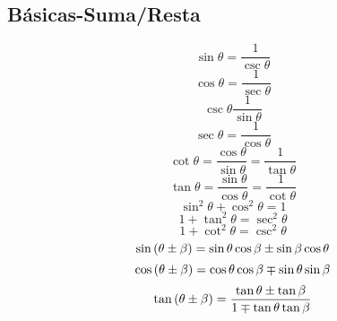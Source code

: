 \documentclass[
	12pt, %
	fleqn, %
	a4paper, %
	oneside, %
]{LegrandOrangeBook}
\begin{document}
\subsection{Básicas-Suma/Resta}
\begin{equation}
\sin\theta=\frac{1}{\csc\theta}
\end{equation}
\begin{equation}
\cos\theta=\frac{1}{\sec\theta}
\end{equation}
\begin{equation}
\csc\theta\frac{1}{\sin\theta}
\end{equation}
\begin{equation}
\sec\theta=\frac{1}{\cos\theta}
\end{equation}
\begin{equation}
\cot\theta=\frac{\cos\theta}{\sin\theta}=\frac{1}{\tan\theta}
\end{equation}
\begin{equation}
\tan\theta=\frac{\sin\theta}{\cos\theta}=\frac{1}{\cot\theta}
\end{equation}
\begin{equation}
\sin^2\theta+\cos^2\theta=1
\end{equation}
\begin{equation}
1+\tan^2\theta=\sec^2\theta
\end{equation}
\begin{equation}
1+\cot^2\theta=\csc^2\theta
\end{equation}
\begin{equation}
\sin\left(\theta\pm\beta\right)=\sin\theta\cos\beta\pm\sin\beta\cos\theta
\end{equation}
\begin{equation}
\cos\left(\theta\pm\beta\right)=\cos\theta\cos\beta\mp\sin\theta\sin\beta
\end{equation}
\begin{equation}
\tan\left(\theta\pm\beta\right)=\frac{\tan\theta\pm\tan\beta}{1\mp\tan\theta\tan\beta}
\end{equation}
\end{document}
